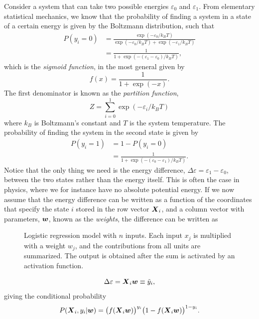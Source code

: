 Consider a system that can take two possible energies $\varepsilon_0$ and $\varepsilon_1$. From elementary statistical mechanics, we know that the probability of finding a system in a state of a certain energy is given by the Boltzmann distribution, such that
\begin{align}
P(y_i=0)&=\frac{\exp(-\varepsilon_0/k_BT)}{\exp(-\varepsilon_0/k_BT)+\exp(-\varepsilon_1/k_BT)}\\
&=\frac{1}{1+\exp(-(\varepsilon_1-\varepsilon_0)/k_BT)},
\end{align}
which is the \textit{sigmoid function}, in the most general given by
\begin{equation}
f(x)=\frac{1}{1+\exp(-x)}.
\end{equation}
The first denominator is known as the \textit{partition function},
\begin{equation}
Z=\sum_{i=0}^1\exp(-\varepsilon_i/k_BT)
\label{eq:partition}
\end{equation}
where $k_B$ is Boltzmann's constant and $T$ is the system temperature. The probability of finding the system in the second state is given by
\begin{align}
P(y_i=1)&=1-P(y_i=0)\\
&=\frac{1}{1+\exp(-(\varepsilon_0-\varepsilon_1)/k_BT)}.
\end{align}
Notice that the only thing we need is the energy difference, $\Delta\varepsilon=\varepsilon_1-\varepsilon_0$, between the two states rather than the energy itself. This is often the case in physics, where we for instance have no absolute potential energy. If we now assume that the energy difference can be written as a function of the coordinates that specify the state $i$ stored in the row vector $\boldsymbol{{X}}_i$, and a column vector with parameters, $\boldsymbol{{w}}$, known as the \textit{weights}, the difference can be written as
\begin{figure}
	\centering
	
	\caption{Logistic regression model with $n$ inputs. Each input $x_{j}$ is multiplied with a weight $w_j$, and the contributions from all units are summarized. The output is obtained after the sum is activated by an activation function.}
	\label{fig:single_perceptron}
\end{figure}
\begin{equation}
\Delta\varepsilon=\boldsymbol{{X}}_i\boldsymbol{{w}}\equiv\tilde{y}_i,
\end{equation}
giving the conditional probability
\begin{equation}
P(\boldsymbol{{X}}_i,y_i|\boldsymbol{{w}})=\big(f(\boldsymbol{{X}}_i\boldsymbol{{w}})\big)^{y_i}\big(1-f(\boldsymbol{{X}}_i\boldsymbol{{w}})\big)^{1-y_i}.
\end{equation}
